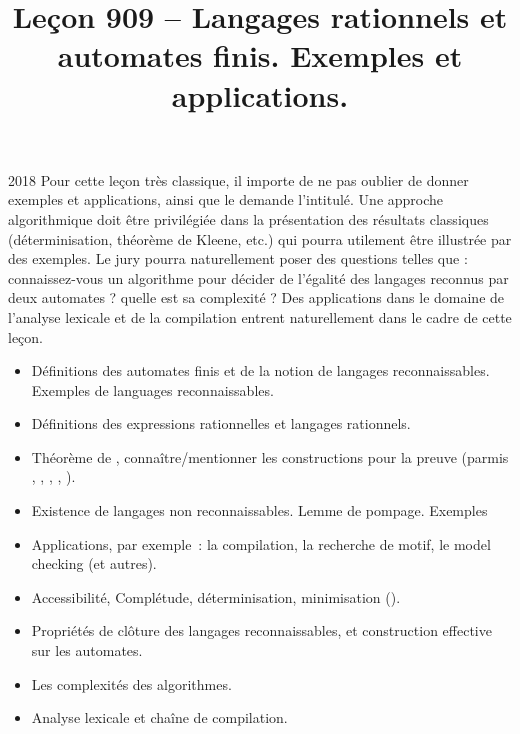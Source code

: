 \documentclass{agregfiche}
\title{Leçon 909 -- Langages rationnels et automates finis.  Exemples et applications.}
\begin{document}
\maketitle

\secrapports

\begin{rapport}{2018}
Pour cette leçon très classique, il importe de ne pas oublier de donner exemples et applications, ainsi
que le demande l’intitulé.
Une approche algorithmique doit être privilégiée dans la présentation des résultats classiques (déterminisation, théorème de
Kleene, etc.) qui pourra utilement être illustrée par des exemples. Le jury pourra naturellement poser des questions telles que : connaissez-vous un algorithme pour décider de l’égalité des langages reconnus par deux automates ? quelle est sa complexité ?
Des applications dans le domaine de l’analyse lexicale et de la compilation entrent naturellement dans
le cadre de cette leçon.
\end{rapport}

\secindispensables

\begin{itemize}
\item  Définitions des automates finis et de la notion de langages reconnaissables. Exemples de languages reconnaissables.
\item Définitions des expressions rationnelles et langages rationnels.
\item Théorème de , connaître/mentionner les constructions pour la preuve (parmis , , , , ).
\end{itemize}

\secasavoir

\begin{itemize}
	\item Existence de langages non reconnaissables. Lemme de pompage. Exemples
	\item Applications, par exemple~: la compilation, la recherche de motif, le
	model checking (et autres).
	\item Accessibilité, Complétude, déterminisation, minimisation ().
	\item Propriétés de clôture des langages reconnaissables, et construction
	effective sur les automates.
	\item Les complexités des algorithmes.
  	\item Analyse lexicale et chaîne de compilation.
\end{itemize}
\end{document}
